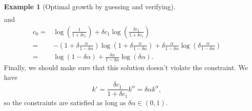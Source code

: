 \documentclass[12pt,reqno]{amsart}
\theoremstyle{definition}
\newtheorem{example}{Example}[section]
\begin{document}
\begin{example}[Optimal growth by guessing and verifying]
\begin{align*}
 \end{align*}
 and 
 \begin{align*}
   c_0 = & \log\left(\frac{1}{1+\delta c_1}\right) + \delta c_1
   \log\left(\frac{\delta c_1}{1+\delta c_1} \right) \\
   = & -\left(1 + \delta \frac{\alpha}{1-\delta \alpha}\right) 
   \log\left(1+\delta  \frac{\alpha}{1-\delta \alpha}\right) + 
   \delta \frac{\alpha}{1-\delta \alpha} 
   \log\left(\delta \frac{\alpha}{1-\delta \alpha} \right) \\
   = & \log(1-\delta \alpha) + \frac{\delta \alpha}{1-\delta \alpha}
   \log(\delta \alpha).
 \end{align*}
 Finally, we should make sure that this solution doesn't violate the
 constraint. We have
 \[ k' = \frac{\delta c_1}{1+\delta c_1} k^\alpha = \delta \alpha
 k^\alpha, \]
 so the constraints are satisfied as long  as $\delta \alpha \in
 (0,1)$.  
\end{example}
\end{document}
